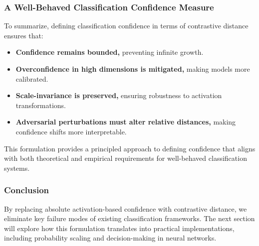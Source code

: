 \subsubsection{A Well-Behaved Classification Confidence Measure}

To summarize, defining classification confidence in terms of contrastive distance ensures that:

\begin{itemize}
    \item \textbf{Confidence remains bounded,} preventing infinite growth.
    \item \textbf{Overconfidence in high dimensions is mitigated,} making models more calibrated.
    \item \textbf{Scale-invariance is preserved,} ensuring robustness to activation transformations.
    \item \textbf{Adversarial perturbations must alter relative distances,} making confidence shifts more interpretable.
\end{itemize}

This formulation provides a principled approach to defining confidence that aligns with both theoretical and empirical requirements for well-behaved classification systems.

\subsubsection{Conclusion}

By replacing absolute activation-based confidence with contrastive distance, we eliminate key failure modes of existing classification frameworks. The next section will explore how this formulation translates into practical implementations, including probability scaling and decision-making in neural networks.
